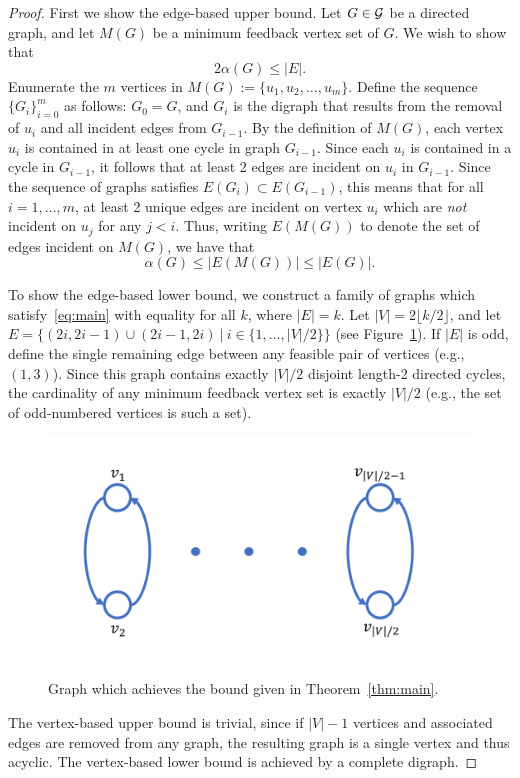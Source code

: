 \documentclass[journal,12pt,onecolumn]{IEEETran}  %
\begin{document}
\begin{proof}
First we show the edge-based upper bound.
Let $G\in\mathcal{G}$ be a directed graph, and let $M(G)$ be a minimum feedback vertex set of $G$.
We wish to show that 
\begin{equation}
2\alpha(G)\leq |E|.
\end{equation}
Enumerate the $m$ vertices in $M(G):=\{u_1,u_2,\ldots,u_m\}$.
Define the sequence $\{G_i\}_{i=0}^m$ as follows: $G_0=G$, and $G_i$ is the digraph that results from the removal of $u_i$ and all incident edges from $G_{i-1}$.
By the definition of $M(G)$, each vertex $u_i$ is contained in at least one cycle in graph $G_{i-1}$.
Since each $u_i$ is contained in a cycle in $G_{i-1}$, it follows that at least 2 edges are incident on $u_i$ in $G_{i-1}$.
Since the sequence of graphs satisfies $E(G_{i})\subset E(G_{i-1})$, this means that for all $i=1,\ldots,m$, at least 2 unique edges are incident on vertex $u_i$ which are \emph{not} incident on $u_j$ for any $j<i$.
%
Thus, writing $E(M(G))$ to denote the set of edges incident on $M(G)$, we have that
\begin{equation}
\alpha(G)\leq|E(M(G))|\leq |E(G)|.
\end{equation}

To show the edge-based lower bound, we construct a family of graphs which satisfy~\eqref{eq:main} with equality for all $k$, where $|E|=k$.
Let $|V|=2\lfloor k/2\rfloor$, and let $E=\{(2i,2i-1)\cup(2i-1,2i)\ |\ i\in\{1,\ldots,|V|/2\}\}$ (see Figure~\ref{fig:graph}).
If $|E|$ is odd, define the single remaining edge between any feasible pair of vertices (e.g., $(1,3)$).
Since this graph contains exactly $|V|/2$ disjoint length-2 directed cycles, the cardinality of any minimum feedback vertex set is exactly $|V|/2$ (e.g., the set of odd-numbered vertices is such a set).
%

\begin{figure}
\centering
\includegraphics[width=.5\textwidth]{gfx/graph}
\caption{\label{fig:graph} Graph which achieves the bound given in Theorem~\ref{thm:main}.}
\end{figure}


The vertex-based upper bound is trivial, since if $|V|-1$ vertices and associated edges are removed from any graph, the resulting graph is a single vertex and thus acyclic.
The vertex-based lower bound is achieved by a complete digraph.
\end{proof}








\end{document}
